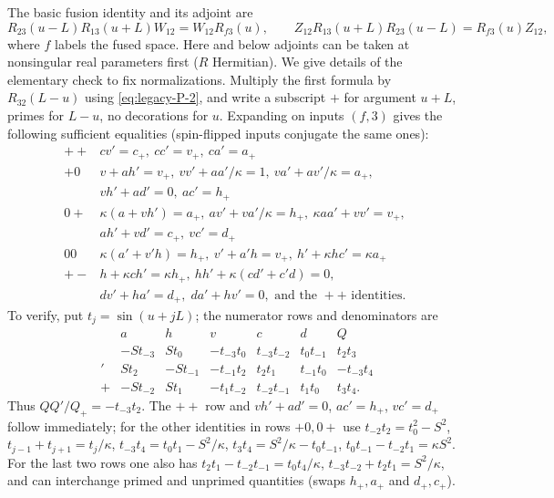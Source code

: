The basic fusion identity and its adjoint are
\begin{equation}
 R_{23}(u-L)R_{13}(u+L)W_{12}=W_{12} R_{f3}(u),\qquad
 Z_{12} R_{13}(u+L)R_{23}(u-L)=R_{f3}(u) Z_{12},                \label{eq:legacy-P-3}
\end{equation}
where $f$ labels the fused space. Here and below adjoints can be taken at nonsingular real parameters first ($R$ Hermitian). We give details of the elementary check to fix normalizations. Multiply the first formula by $R_{32}(L-u)$ using \eqref{eq:legacy-P-2}, and write a subscript $+$ for argument $u+L$, primes for $L-u$, no decorations for $u$. Expanding on inputs $(f,3)$ gives the following sufficient equalities (spin-flipped inputs conjugate the same ones):
\[
\begin{array}{l|l}
 ++&cv'=c_+,\ cc'=v_+,\ ca'=a_+\\
 +0&v+a h'=v_+,\ vv'+aa'/\kappa=1,\ va'+av'/\kappa=a_+,\;\\
 &v h'+a d'=0,\ ac'=h_+\\
 0+&\kappa(a+v h')=a_+,\ av'+va'/\kappa=h_+,\ \kappa aa'+vv'=v_+,\;\\
 &a h'+v d'=c_+,\ vc'=d_+\\
 00&\kappa(a'+v'h)=h_+,\ v'+a'h=v_+,\ h'+\kappa h c'=\kappa a_+\\
 +-&h+\kappa c h'=\kappa h_+,\ hh'+\kappa(c d'+c'd)=0,\\
 &d v'+h a'=d_+,\;d a'+h v'=0,\text{ and the }++\text{ identities}.
\end{array}
\]
To verify, put $t_j=\sin(u+jL)$; the numerator rows and denominators are
\[
\begin{array}{c|rrrrr|l}
 &a&h&v&c&d&Q\\
 &-S t_{-3}&S t_0&-t_{-3}t_0&t_{-3}t_{-2}&t_0t_{-1}&t_2t_3\\
 '&S t_2&-S t_{-1}&-t_{-1}t_2&t_2t_1&t_{-1}t_0&-t_{-3}t_4\\
 +&-S t_{-2}&S t_1&-t_1t_{-2}&t_{-2}t_{-1}&t_1t_0&t_3t_4 .
\end{array}
\]
Thus $QQ'/Q_+=-t_{-3}t_2$. The $++$ row and $v h'+a d'=0$, $ac'=h_+$, $vc'=d_+$ follow immediately; for the other identities in rows $+0,0+$ use $t_{-2}t_2=t_0^2-S^2$, $t_{j-1}+t_{j+1}=t_j/\kappa$,
$t_{-3}t_4=t_0t_1-S^2/\kappa$, $t_3t_4=S^2/\kappa-t_0t_{-1}$, $t_0t_{-1}-t_{-2}t_1=\kappa S^2$. For the last two rows one also has
$t_2t_1-t_{-2}t_{-1}=t_0t_4/\kappa$,
$t_{-3}t_{-2}+t_2t_1=S^2/\kappa$, and can interchange primed and unprimed quantities (swaps $h_+,a_+$ and $d_+,c_+$).


